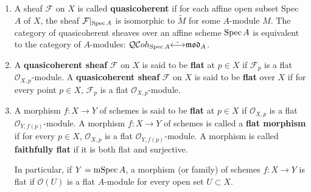 \documentclass[12pt]{article}
\theoremstyle{mytheoremstyle}
\newcommand{\cO}{\mathcal{O}}
\newcommand{\cF}{\mathcal{F}}
\newcommand{\spec}{\text{Spec\hspace*{.5mm}}}
\newcommand{\mspec}{\text{mSpec\hspace*{.5mm}}}
\begin{document}
\begin{enumerate}

    \item A sheaf $\cF$ on $X$ is called \textbf{quasicoherent} if for each affine
          open subset Spec $A$ of $X$, the sheaf $\cF|_{\spec A}$
          is isomorphic to $\widetilde{M}$ for some $A$-module $M$.
          The category of quasicoherent sheaves over an affine
          scheme $\spec A$ is equivalent to the category of $A$-modules:
          $\mathcal{QC}oh_{\spec A} \tilde{\longleftrightarrow}
              \mathfrak{mod}_A$.

    \item A \textbf{quasicoherent sheaf} $\cF$ on $X$ is said to be
          \textbf{flat} at $p\in X$
          if $\cF_p$ is a flat $\cO_{X,p}$-module.
          A \textbf{quasicoherent sheaf} $\cF$ on $X$ is said to be
          \textbf{flat} over $X$
          if for every point $p\in X$, $\cF_p$ is a flat
          $\cO_{X,p}$-module.

    \item A morphism $f\colon X\to Y$ of schemes is said to be \textbf{flat}
          at $p\in X$ if $\cO_{X,p}$ is a flat
          $\cO_{Y,f(p)}$-module.
          A morphism $f\colon X\to Y$ of schemes is called a \textbf{flat
              morphism} if for every $p\in X$, $\cO_{X,p}$ is a flat
          $\cO_{Y,f(p)}$-module.
          A morphism is called \textbf{faithfully flat} if it is both
          flat and surjective.

          In particular, if $Y=\mspec A$, a morphism (or family)
          of schemes
          $f\colon X\to Y$ is flat if $\cO(U)$ is a flat $A$-module for every
          open set $U\subset X$.

\end{enumerate}
\end{document}
